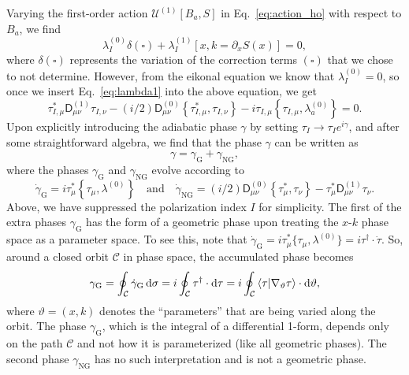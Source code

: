 Varying the first-order action $\mathscr{U}^{(1)}[B_{a}, S]$ in Eq.~\eqref{eq:action_ho} with respect to $B_{a}$, we find
%
\begin{equation}
  \lambda_{I}^{(0)}\delta(\square) + \lambda_{I}^{(1)}\left[x, k=\partial_{x}S(x)\right] = 0,
\end{equation}
%
where $\delta(\square)$ represents the variation of the correction terms $(\square)$ that we chose to not determine.
However, from the eikonal equation we know that $\lambda_{I}^{(0)} = 0$, so once we insert Eq.~\eqref{eq:lambda1} into the above equation, we get
%
\begin{equation}
\tau_{I,\mu}^{*}\mathsf{D}_{\mu\nu}^{(1)}\tau_{I,\nu} - (i/2)\mathsf{D}^{(0)}_{\mu\nu}\left\{\tau_{I,\mu}^{*}, \tau_{I,\nu}\right\}
  - i\tau_{I,\mu}\left\{\tau_{I,\mu}, \lambda^{(0)}_{a}\right\} = 0.
\end{equation}
%
Upon explicitly introducing the adiabatic phase $\gamma$ by setting $\tau_{I} \to \tau_{I} e^{i\gamma}$, and after some straightforward algebra, we find that the phase $\gamma$ can be written as
%
\begin{equation}
  {\gamma} = {\gamma}_{\text{G}} + {\gamma}_{\text{NG}},
\end{equation}
%
where the phases ${\gamma}_{\text{G}}$ and ${\gamma}_{\text{NG}}$ evolve according to
%
\begin{equation}
  \dot{\gamma}_{\text{G}} = i\tau_{\mu}^{*}\left\{\tau_{\mu}, \lambda^{(0)}\right\}
  \quad\text{and}\quad
\dot{\gamma}_{\text{NG}} = (i/2)\mathsf{D}^{(0)}_{\mu\nu}\left\{\tau_{\mu}^{*}, \tau_{\nu}\right\} - \tau_{\mu}^{*}\mathsf{D}_{\mu\nu}^{(1)}\tau_{\nu}.
\label{eq:extra_phases}
\end{equation}
%
Above, we have suppressed the polarization index $I$ for simplicity.
The first of the extra phases $\gamma_{\text{G}}$ has the form of a geometric phase upon treating the $x$-$k$ phase space as a parameter space.
To see this, note that $\dot{\gamma}_{\text{G}} = i\tau^{*}_{\mu}\{\tau_{\mu},\lambda^{(0)}\} = i\tau^{\dagger}\cdot\dot{\tau}$.
So, around a closed orbit $\mathcal{C}$ in phase space, the accumulated phase becomes
%
\begin{equation}
\gamma_{\text{G}}
= \oint_{\mathcal{C}} \dot{\gamma}_{\text{G}}\,\mathrm{d}{\sigma}
= i\oint_{\mathcal{C}} \tau^{\dagger}\cdot\mathrm{d}{\tau}
= i\oint_{\mathcal{C}} \mathinner{\langle{\tau |\nabla_{\vartheta}\tau}\rangle}
\cdot\mathrm{d}\vartheta,
\end{equation}
%
where $\vartheta = (x, k)$ denotes the ``parameters'' that are being varied along the orbit.
The phase $\gamma_{\text{G}}$, which is the integral of a differential 1-form, depends only on the path $\mathcal{C}$ and not how it is parameterized (like all geometric phases).
The second phase $\gamma_{\text{NG}}$ has no such interpretation and is not a geometric phase.

